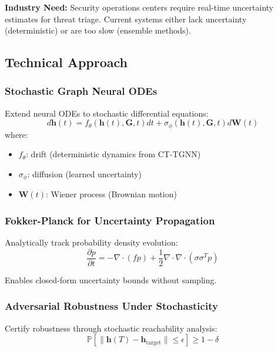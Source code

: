 \documentclass[11pt,letterpaper]{article}
\begin{document}
\textbf{Industry Need:} Security operations centers require real-time uncertainty estimates for threat triage. Current systems either lack uncertainty (deterministic) or are too slow (ensemble methods).

\subsection{Technical Approach}

\subsubsection{Stochastic Graph Neural ODEs}

Extend neural ODEs to stochastic differential equations:
\begin{equation}
d\mathbf{h}(t) = f_\theta(\mathbf{h}(t), \mathbf{G}, t) dt + \sigma_\phi(\mathbf{h}(t), \mathbf{G}, t) d\mathbf{W}(t)
\end{equation}
where:
\begin{itemize}
\item $f_\theta$: drift (deterministic dynamics from CT-TGNN)
\item $\sigma_\phi$: diffusion (learned uncertainty)
\item $\mathbf{W}(t)$: Wiener process (Brownian motion)
\end{itemize}

\subsubsection{Fokker-Planck for Uncertainty Propagation}

Analytically track probability density evolution:
\begin{equation}
\frac{\partial p}{\partial t} = -\nabla \cdot (f p) + \frac{1}{2}\nabla \cdot \nabla \cdot (\sigma \sigma^T p)
\end{equation}

Enables closed-form uncertainty bounds without sampling.

\subsubsection{Adversarial Robustness Under Stochasticity}

Certify robustness through stochastic reachability analysis:
\begin{equation}
\mathbb{P}[\|\mathbf{h}(T) - \mathbf{h}_{\text{target}}\| \leq \epsilon] \geq 1 - \delta
\end{equation}
\end{document}
